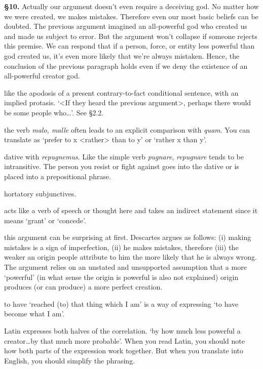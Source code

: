 \textbf{§10.} Actually our argument doesn't even require a deceiving god. No matter how we were created, we makes mistakes. Therefore even our most basic beliefs can be doubted. The previous argument imagined an all-powerful god who created us and made us subject to error. But the argument won't collapse if someone rejects this premise. We can respond that if a person, force, or entity less powerful than god created us, it's even more likely that we're always mistaken. Hence, the conclusion of the previous paragraph holds even if we deny the existence of an all-powerful creator god.

 like the apodosis of a present contrary-to-fact conditional sentence, with an implied protasis. `<If they heard the previous argument>, perhaps there would be some people who\dots'. See §2.2.

 the verb \textit{malo, malle} often leads to an explicit comparison with \textit{quam}. You can translate as `prefer to x <rather> than to y' or `rather x than y'.

 dative with \textit{repugnemus}. Like the simple verb \textit{pugnare}, \textit{repugnare} tends to be intransitive. The person you resist or fight against goes into the dative or is placed into a prepositional phrase.

 hortatory subjunctives.

 acts like a verb of speech or thought here and takes an indirect statement since it means `grant' or `concede'.

 this argument can be surprising at first. Descartes argues as follows: (i) making mistakes is a sign of imperfection, (ii) he makes mistakes, therefore (iii) the weaker an origin people attribute to him the more likely that he is always wrong. The argument relies on an unstated and unsupported assumption that a more `powerful' (in what sense the origin is powerful is also not explained) origin produces (or can produce) a more perfect creation.

 to have `reached (to) that thing which I am' is a way of expressing `to have become what I am'.

 Latin expresses both halves of the correlation. `by how much less powerful a creator\dots by that much more probable'. When you read Latin, you should note how both parts of the expression work together. But when you translate into English, you should simplify the phrasing.

